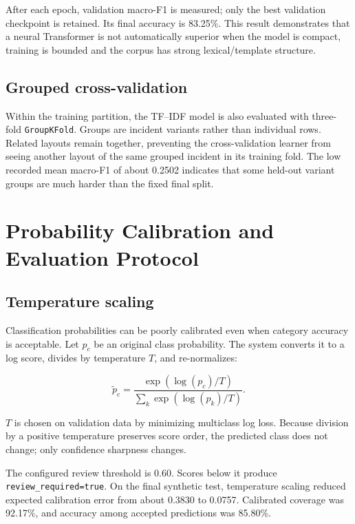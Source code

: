 \documentclass[12pt,a4paper]{report}
\newcommand{\code}[1]{\texttt{#1}}
\begin{document}
After each epoch, validation macro-F1 is measured; only the best validation checkpoint is retained. Its final accuracy is 83.25\%. This result demonstrates that a neural Transformer is not automatically superior when the model is compact, training is bounded and the corpus has strong lexical/template structure.

\section{Grouped cross-validation}

Within the training partition, the TF--IDF model is also evaluated with three-fold \code{GroupKFold}. Groups are incident variants rather than individual rows. Related layouts remain together, preventing the cross-validation learner from seeing another layout of the same grouped incident in its training fold. The low recorded mean macro-F1 of about 0.2502 indicates that some held-out variant groups are much harder than the fixed final split.

\chapter{Probability Calibration and Evaluation Protocol}

\section{Temperature scaling}

Classification probabilities can be poorly calibrated even when category accuracy is acceptable. Let $p_c$ be an original class probability. The system converts it to a log score, divides by temperature $T$, and re-normalizes:

\begin{equation}
\tilde{p}_c=\frac{\exp(\log(p_c)/T)}{\sum_k\exp(\log(p_k)/T)}.
\end{equation}

$T$ is chosen on validation data by minimizing multiclass log loss. Because division by a positive temperature preserves score order, the predicted class does not change; only confidence sharpness changes.

The configured review threshold is 0.60. Scores below it produce \code{review\_required=true}. On the final synthetic test, temperature scaling reduced expected calibration error from about 0.3830 to 0.0757. Calibrated coverage was 92.17\%, and accuracy among accepted predictions was 85.80\%.
\end{document}
